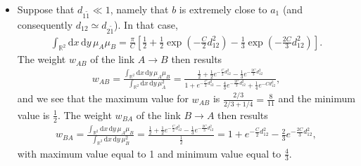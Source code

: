 \documentclass[12pt]{article}
\newcommand{\xd}{\mathrm{d}}
\numberwithin{equation}{section} %
\numberwithin{figure}{section} %
\theoremstyle{definition}
\begin{document}
\begin{itemize}
	\item
Suppose that $d_{1 \tilde{1}} \ll 1$, namely that $b$ is extremely close to $a_1$ (and consequently $d_{12} \simeq d_{2 \tilde{1}}$). In that case,
\begin{align}
\int_{{\mathbb R}^2} \xd x \, \xd y \, \mu_A \mu_B 
= \frac{\pi}{C} \left[  \frac12  + \frac12  \exp \left( - \frac{C}{2} d_{12 }^2 \right)  - \frac{1}{3} \exp \left( -\frac{2C}{3} d_{12}^2 \right)  \right].
\end{align}
The weight $w_{AB}$ of the link $A \rightarrow B$ then results
\begin{align}
w_{AB} = \frac{\int_{{\mathbb R}^2} \xd x \, \xd y \, \mu_A \mu_B}{\int_{{\mathbb R}^2} \xd x \, \xd y \, \mu_A^2} = \frac{ \frac12  + \frac12  e^{ - \frac{C}{2} d_{12 }^2 }  - \frac{1}{3} e^{-\frac{2C}{3} d_{12}^2 } }{ 1+e^{- \frac{C}{2}d^2_{12}} - \frac{4}{3} e^{- \frac{2C}{3} d^2_{1 2} } + \frac{1}{4} e^{- C d_{12}^2 } },%
\end{align}
and we see that the maximum value for $w_{AB}$ is $\frac{2/3}{2/3+1/4} = \frac{8}{11}$ and the minimum value is $\frac12$. The weight $w_{BA}$ of the link $B \rightarrow A$ then results
\begin{align}
w_{BA} = \frac{\int_{{\mathbb R}^2} \xd x \, \xd y \, \mu_A \mu_B}{\int_{{\mathbb R}^2} \xd x \, \xd y \, \mu_B^2} = \frac{ \frac12  + \frac12  e^{ - \frac{C}{2} d_{12 }^2 }  - \frac{1}{3} e^{-\frac{2C}{3} d_{12}^2 } }{ \frac12 } = 1+e^{- \frac{C}{2}d^2_{12}} - \frac{2}{3} e^{- \frac{2C}{3} d^2_{1 2} },%
\end{align}
with maximum value equal to 1 and minimum value equal to $\frac{4}{3}$.
	

\end{itemize}
\end{document}
